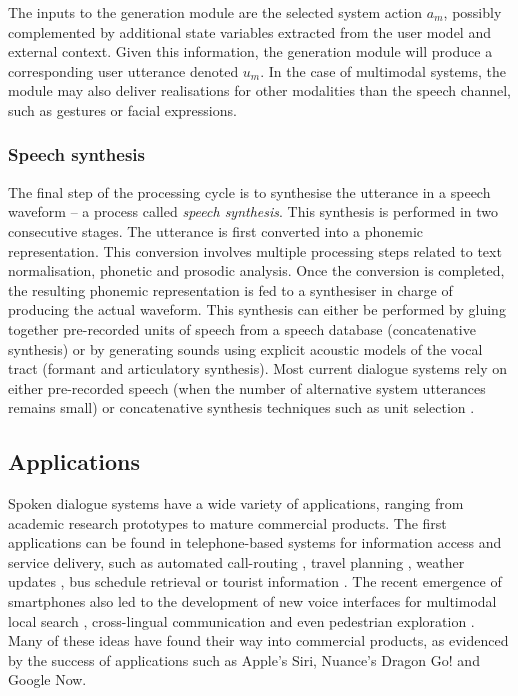 The inputs to the generation module are the selected system action $a_m$, possibly complemented by additional state variables extracted from the user model and external context. Given this information, the generation module will produce a corresponding user utterance denoted $u_m$.  In the case of multimodal systems, the module may also deliver realisations for other modalities than the speech channel, such as gestures or facial expressions.

\subsubsection*{Speech synthesis}
The final step of the processing cycle is to synthesise the utterance in a speech waveform --  a process called \textit{speech synthesis}.  This synthesis is performed in two consecutive stages.  The utterance is first converted into a phonemic representation. This conversion involves multiple processing steps related to text normalisation, phonetic and prosodic analysis.  Once the conversion is completed, the resulting phonemic representation is fed to a synthesiser in charge of producing the actual waveform. This synthesis can either be performed by gluing together pre-recorded units of speech from a speech database (concatenative synthesis) or by generating sounds using explicit acoustic models of the vocal tract (formant and articulatory synthesis). Most current dialogue systems rely on either pre-recorded speech (when the number of alternative system utterances remains small) or concatenative synthesis techniques such as unit selection \citep{hunt1996}.

\subsection{Applications}

Spoken dialogue systems have a wide variety of applications, ranging from academic research prototypes to mature commercial products. The first applications can be found in telephone-based systems for information access and service delivery, such as automated call-routing \citep{GorinRW97}, travel planning \citep{walker2001}, weather updates \citep{jupiter}, bus schedule retrieval \citep{RauxLBBE05} or tourist information \citep{lemon2006}.  The recent emergence of smartphones also led to the development of new voice interfaces for multimodal local search \citep{EhlenJ13}, cross-lingual communication \citep{yochina} and even pedestrian exploration  \citep{janarthanam2012integrating}.  Many of these ideas have found their way into commercial products, as evidenced by the success of applications such as Apple's Siri, Nuance's Dragon Go! and Google Now. 

